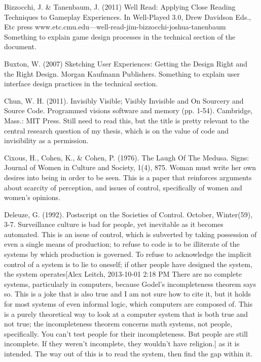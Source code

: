 Bizzocchi, J. \& Tanenbaum, J. (2011) Well Read: Applying Close Reading Techniques to Gameplay 
	Experiences. In Well-Played 3.0, Drew Davidson Eds., Etc press
	www.etc.cmu.edu—well-read-jim-bizzocchi-joshua-tanenbaum
	Something to explain game design processes in the technical section of the document.

Buxton, W. (2007) Sketching User Experiences: Getting the Design Right and the Right Design. Morgan Kaufmann Publishers. 
	Something to explain user interface design practices in the technical section.

Chun, W. H. (2011). Invisibly Visible; Visibly Invisible and On Sourcery and Source Code. Programmed visions software and memory (pp. 1-54). Cambridge, Mass.: MIT Press.
	Still need to read this, but the title is pretty relevant to the central research question of my thesis, which is on the value of code and invisibility as a permission.

Cixous, H., Cohen, K., \& Cohen, P. (1976). The Laugh Of The Medusa. Signs: Journal of Women in Culture and Society, 1(4), 875.
	Woman must write her own desires into being in order to be seen. This is a paper that reinforces arguments about scarcity of perception, and issues of control, specifically of women and women's opinions.

Deleuze, G. (1992). Postscript on the Societies of Control. October, Winter(59), 3-7.
	Surveillance culture is bad for people, yet inevitable as it becomes automated. This is an issue of control, which is subverted by taking possession of even a single means of production; to refuse to code is to be illiterate of the systems by which production is governed. To refuse to acknowledge the implicit control of a system is to lie to oneself; if other people have designed the system, the system operates[Alex Leitch, 2013-10-01 2:18 PM
There are no complete systems, particularly in computers, because Godel's incompleteness theorem says so. This is a joke that is also true and I am not sure how to cite it, but it holds for most systems of even informal logic, which computers are composed of. This is a purely theoretical way to look at a computer system that is both true and not true; the incompleteness theorem concerns math systems, not people, specifically. You can't test people for their incompleteness. But people are still incomplete. If they weren't incomplete, they wouldn't have religion.] as it is intended. The way out of this is to read the system, then find the gap within it. 

